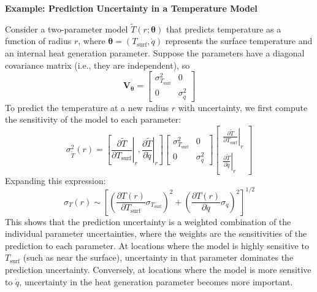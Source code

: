 \begin{exampleBox}
\textbf{Example: Prediction Uncertainty in a Temperature Model}

Consider a two-parameter model $\tilde{T}(r; \boldsymbol{\theta})$ that predicts temperature as a function of radius $r$, where $\boldsymbol{\theta} = (T_{\text{surf}}, \dot{q})$ represents the surface temperature and an internal heat generation parameter. Suppose the parameters have a diagonal covariance matrix (i.e., they are independent), so
\begin{equation}
    \mathbf{V}_{\boldsymbol{\theta}} = \begin{bmatrix} \sigma^2_{T_{\text{surf}}} & 0 \\ 0 & \sigma^2_{\dot{q}} \end{bmatrix}
\end{equation}
To predict the temperature at a new radius $r$ with uncertainty, we first compute the sensitivity of the model to each parameter:
\begin{equation}
    \sigma^2_{\tilde{T}}(r) = \left[\left.\frac{\partial \tilde{T}}{\partial T_{\text{surf}}}\right|_r, \left.\frac{\partial \tilde{T}}{\partial \dot{q}}\right|_r\right] \begin{bmatrix} \sigma^2_{T_{\text{surf}}} & 0 \\ 0 & \sigma^2_{\dot{q}} \end{bmatrix} \begin{bmatrix} \left.\frac{\partial \tilde{T}}{\partial T_{\text{surf}}}\right|_r \\ \left.\frac{\partial \tilde{T}}{\partial \dot{q}}\right|_r \end{bmatrix}
\end{equation}
Expanding this expression:
\begin{equation}
    \sigma_T(r) \sim \left[\left(\frac{\partial T(r)}{\partial T_{\text{surf}}} \sigma_{T_{\text{surf}}}\right)^2 + \left(\frac{\partial T(r)}{\partial \dot{q}} \sigma_{\dot{q}}\right)^2\right]^{1/2}
\end{equation}
This shows that the prediction uncertainty is a weighted combination of the individual parameter uncertainties, where the weights are the sensitivities of the prediction to each parameter. At locations where the model is highly sensitive to $T_{\text{surf}}$ (such as near the surface), uncertainty in that parameter dominates the prediction uncertainty. Conversely, at locations where the model is more sensitive to $\dot{q}$, uncertainty in the heat generation parameter becomes more important.
\end{exampleBox}


